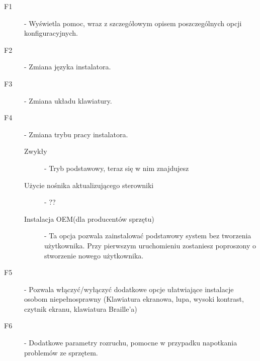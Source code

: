 \begin{description}
\item[F1] - Wyświetla pomoc, wraz z szczegółowym opisem poszczególnych opcji konfiguracyjnych.
\item[F2] - Zmiana języka instalatora.
\item[F3] - Zmiana układu klawiatury.
\item[F4] - Zmiana trybu pracy instalatora.
        \begin{description}
        \item[Zwykły] - Tryb podstawowy, teraz się w nim znajdujesz
        \item[Użycie nośnika aktualizującego sterowniki] - ??
        \item[Instalacja OEM(dla producentów sprzętu)] - Ta opcja pozwala zainstalować podstawowy system bez tworzenia użytkownika. Przy pierwszym uruchomieniu zostaniesz poproszony o stworzenie nowego użytkownika.
        \end{description}
\item[F5] - Pozwala włączyć/wyłączyć dodatkowe opcje ułatwiające instalacje osobom niepełnosprawny (Klawiatura ekranowa, lupa, wysoki kontrast, czytnik ekranu, klawiatura Braille'a)
\item[F6] - Dodatkowe parametry rozruchu, pomocne w przypadku napotkania problemów ze sprzętem.
\end{description}
\clearpage
